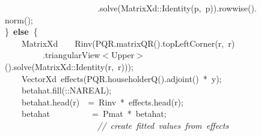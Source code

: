 \documentclass[shortnames,article]{jss}
\newcommand{\hlstd}[1]{\textcolor[rgb]{0,0,0}{#1}}
\newcommand{\hlopt}[1]{\textcolor[rgb]{0,0,0}{#1}}
\newcommand{\hlslc}[1]{\textcolor[rgb]{0.67,0.13,0.13}{\it{#1}}}
\newcommand{\hlkwa}[1]{\textcolor[rgb]{0.61,0.13,0.93}{\bf{#1}}}
\newcommand{\hlkwd}[1]{\textcolor[rgb]{0,0,0}{#1}}
\begin{document}
\begin{figure}[htb]
    \hlstd{}\hlstd{\ \ \ \ \ \ \ \ \ \ \ \ \ \ \ \ \ \ \ \ \ \ }\hlstd{}\hlopt{.}\hlstd{}\hlkwd{solve}\hlstd{}\hlopt{(}\hlstd{MatrixXd}\hlopt{::}\hlstd{}\hlkwd{Identity}\hlstd{}\hlopt{(}\hlstd{p}\hlopt{,\ }\hlstd{p}\hlopt{)).}\hlstd{}\hlkwd{rowwise}\hlstd{}\hlopt{().}\hlstd{}\hlkwd{norm}\hlstd{}\hlopt{();}\hspace*{\fill}\\
    \hlstd{}\hlopt{\}\ }\hlstd{}\hlkwa{else\ }\hlstd{}\hlopt{\{}\hspace*{\fill}\\
    \hlstd{}\hlstd{\ \ \ \ }\hlstd{MatrixXd}\hlstd{\ \ \ \ }\hlstd{}\hlkwd{Rinv}\hlstd{}\hlopt{(}\hlstd{PQR}\hlopt{.}\hlstd{}\hlkwd{matrixQR}\hlstd{}\hlopt{().}\hlstd{}\hlkwd{topLeftCorner}\hlstd{}\hlopt{(}\hlstd{r}\hlopt{,\ }\hlstd{r}\hlopt{)}\hspace*{\fill}\\
    \hlstd{}\hlstd{\ \ \ \ \ \ \ \ \ }\hlstd{}\hlopt{.}\hlstd{triangularView}\hlopt{$<$}\hlstd{Upper}\hlopt{$>$().}\hlstd{}\hlkwd{solve}\hlstd{}\hlopt{(}\hlstd{MatrixXd}\hlopt{::}\hlstd{}\hlkwd{Identity}\hlstd{}\hlopt{(}\hlstd{r}\hlopt{,\ }\hlstd{r}\hlopt{)));}\hspace*{\fill}\\
    \hlstd{}\hlstd{\ \ \ \ }\hlstd{VectorXd\ }\hlkwd{effects}\hlstd{}\hlopt{(}\hlstd{PQR}\hlopt{.}\hlstd{}\hlkwd{householderQ}\hlstd{}\hlopt{().}\hlstd{}\hlkwd{adjoint}\hlstd{}\hlopt{()\ {*}\ }\hlstd{y}\hlopt{);}\hspace*{\fill}\\
    \hlstd{}\hlstd{\ \ \ \ }\hlstd{betahat}\hlopt{.}\hlstd{}\hlkwd{fill}\hlstd{}\hlopt{(::}\hlstd{NA\textunderscore REAL}\hlopt{);}\hspace*{\fill}\\
    \hlstd{}\hlstd{\ \ \ \ }\hlstd{betahat}\hlopt{.}\hlstd{}\hlkwd{head}\hlstd{}\hlopt{(}\hlstd{r}\hlopt{)}\hlstd{\ \ }\hlopt{=\ }\hlstd{Rinv\ }\hlopt{{*}\ }\hlstd{effects}\hlopt{.}\hlstd{}\hlkwd{head}\hlstd{}\hlopt{(}\hlstd{r}\hlopt{);}\hspace*{\fill}\\
    \hlstd{}\hlstd{\ \ \ \ }\hlstd{betahat}\hlstd{\ \ \ \ \ \ \ \ \ \ }\hlstd{}\hlopt{=\ }\hlstd{Pmat\ }\hlopt{{*}\ }\hlstd{betahat}\hlopt{;}\hspace*{\fill}\\
    \hlstd{}\hlstd{\ \ \ \ \ \ \ \ \ \ \ \ \ \ \ \ \ \ \ \ \ \ }\hlstd{}\hlslc{//\ create\ fitted\ values\ from\ effects}\hspace*{\fill}\\

\end{figure}
\end{document}
